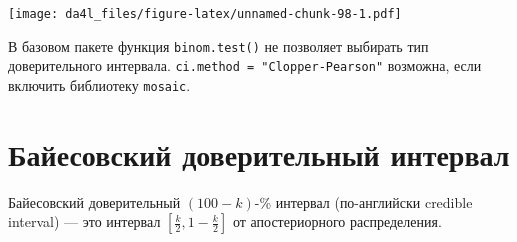 \documentclass[
]{book}
\begin{document}
\texttt{[image: da4l\_files/figure-latex/unnamed-chunk-98-1.pdf]}

В базовом пакете функция \texttt{binom.test()} не позволяет выбирать тип доверительного интервала. \texttt{ci.method\ =\ "Clopper-Pearson"} возможна, если включить библиотеку \texttt{mosaic}.

\hypertarget{ux431ux430ux439ux435ux441ux43eux432ux441ux43aux438ux439-ux434ux43eux432ux435ux440ux438ux442ux435ux43bux44cux43dux44bux439-ux438ux43dux442ux435ux440ux432ux430ux43b-1}{%
\section{Байесовский доверительный интервал}\label{ux431ux430ux439ux435ux441ux43eux432ux441ux43aux438ux439-ux434ux43eux432ux435ux440ux438ux442ux435ux43bux44cux43dux44bux439-ux438ux43dux442ux435ux440ux432ux430ux43b-1}}

Байесовский доверительный \((100-k)\)-\% интервал (по-английски credible interval) --- это интервал \([\frac{k}{2}, 1-\frac{k}{2}]\) от апостериорного распределения.
\end{document}
